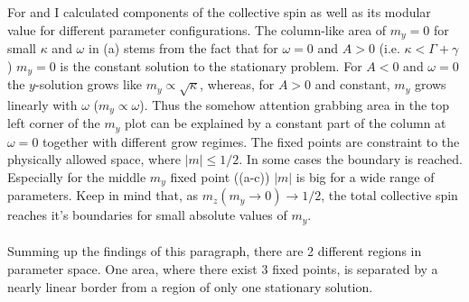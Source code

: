 For  and  I calculated components of the collective spin as well as its modular value for different parameter configurations.
The column-like area of $m_y=0$ for small $\kappa$ and $\omega$ in (a) stems from the fact that for $\omega=0$ and $A>0$ (i.e. $\kappa<\Gamma+\gamma$) $m_y=0$ is the constant solution to the stationary problem. For $A<0$ and $\omega=0$ the $y$-solution grows like $m_y\propto\sqrt{\kappa}$, whereas, for $A>0$ and constant, $m_y$ grows linearly with $\omega$ ($m_y\propto\omega$). Thus the somehow attention grabbing area in the top left corner of the $m_y$ plot can be explained by a constant part of the column at $\omega=0$ together with different grow regimes.
The fixed points are constraint to the physically allowed space, where $|m|\leq1/2$. In some cases the boundary is reached. Especially for the middle $m_y$ fixed point ((a-c)) $|m|$ is big for a wide range of parameters. Keep in mind that, as $m_z(m_y\rightarrow0)\rightarrow1/2$, the total collective spin reaches it's boundaries for small absolute values of $m_y$.\\\\
Summing up the findings of this paragraph, there are 2 different regions in parameter space. One area, where there exist 3 fixed points, is separated by a nearly linear border from a region of only one stationary solution.


